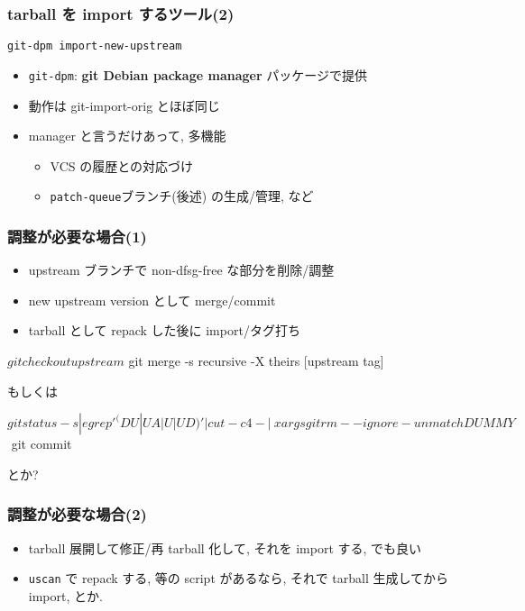 \documentclass[10pt,final,c,dvipdfmx,cjk,colorlinks=false]{beamer}
\providecommand{\alert}[1]{\textbf{#1}}
\begin{document}
\begin{frame}
\frametitle{tarball を import するツール(2)}
\label{sec-2-8}
\begin{block}{\texttt{git-dpm import-new-upstream}}
\label{sec-2-8-1}

\begin{itemize}
\item \texttt{git-dpm}: \alert{git Debian package manager} パッケージで提供
\item 動作は git-import-orig とほぼ同じ
\item manager と言うだけあって, 多機能
\begin{itemize}
\item VCS の履歴との対応づけ
\item \texttt{patch-queue}ブランチ(後述)
        の生成/管理, など
\end{itemize}
\end{itemize}
\end{block}
\end{frame}
\begin{frame}
\frametitle{調整が必要な場合(1)}
\label{sec-2-9}


\begin{itemize}
\item upstream ブランチで non-dfsg-free な部分を削除/調整
\item new upstream version として merge/commit
\item tarball として repack した後に import/タグ打ち
\end{itemize}

\begin{commandline}
$ git checkout upstream
$ git merge -s recursive -X theirs [upstream tag]
\end{commandline}

もしくは

\begin{commandline}
$ git status -s | egrep '^(DU|UA| U|UD)' | cut -c4- | \
    xargs git rm --ignore-unmatch DUMMY$$
$ git commit
\end{commandline}

とか?
\end{frame}
\begin{frame}
\frametitle{調整が必要な場合(2)}
\label{sec-2-10}


\begin{itemize}
\item tarball 展開して修正/再 tarball 化して, それを import する, でも良い
\item \texttt{uscan} で repack する, 等の script があるなら,
  それで tarball 生成してから import, とか.
\end{itemize}
\end{frame}
\end{document}
